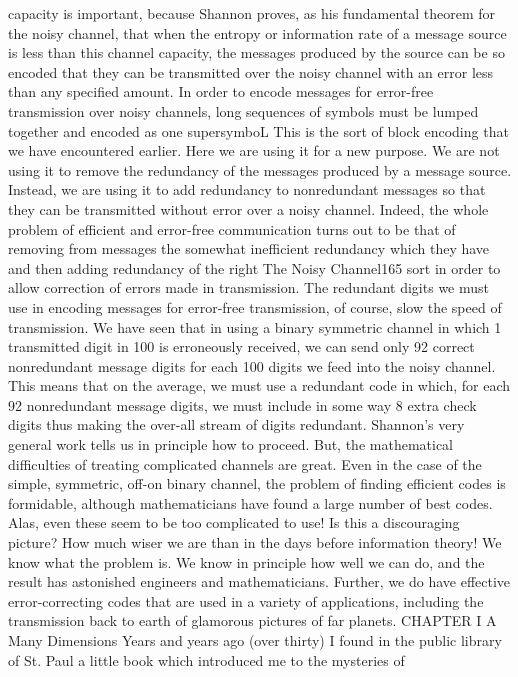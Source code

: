 {{{{{{{{{{capacity is important, because Shannon proves, as his fundamental
theorem for the noisy channel, that when the entropy or information
rate of a message source is less than this channel capacity, the
messages produced by the source can be so encoded that they can
be transmitted over the noisy channel with an error less than any
specified amount.
In order to encode messages for error-free transmission over
noisy channels, long sequences of symbols must be lumped together
and encoded as one supersymboL This is the sort of block encoding
that we have encountered earlier. Here we are using it for a new
purpose. We are not using it to remove the redundancy of the
messages produced by a message source. Instead, we are using it
to add redundancy to nonredundant messages so that they can be
transmitted without error over a noisy channel. Indeed, the whole
problem of efficient and error-free communication turns out to be
that of removing from messages the somewhat inefficient redundancy
which they have and then adding redundancy of the right
The Noisy Channel165
sort in order to allow correction of errors made in transmission.
The redundant digits we must use in encoding messages for
error-free transmission, of course, slow the speed of transmission.
We have seen that in using a binary symmetric channel in which
1 transmitted digit in 100 is erroneously received, we can send only
92 correct nonredundant message digits for each 100 digits we feed
into the noisy channel. This means that on the average, we must
use a redundant code in which, for each 92 nonredundant message
digits, we must include in some way 8 extra check digits thus
making the over-all stream of digits redundant.
Shannon’s very general work tells us in principle how to proceed.
But, the mathematical difficulties of treating complicated channels
are great. Even in the case of the simple, symmetric, off-on binary
channel, the problem of finding efficient codes is formidable,
although mathematicians have found a large number of best codes.
Alas, even these seem to be too complicated to use!
Is this a discouraging picture? How much wiser we are than in
the days before information theory! We know what the problem
is. We know in principle how well we can do, and the result has
astonished engineers and mathematicians. Further, we do have
effective error-correcting codes that are used in a variety of applications,
including the transmission back to earth of glamorous
pictures of far planets.
CHAPTER I A Many Dimensions
Years and years ago (over thirty) I found in the public library
of St. Paul a little book which introduced me to the mysteries of
}}}}}}}}}}
